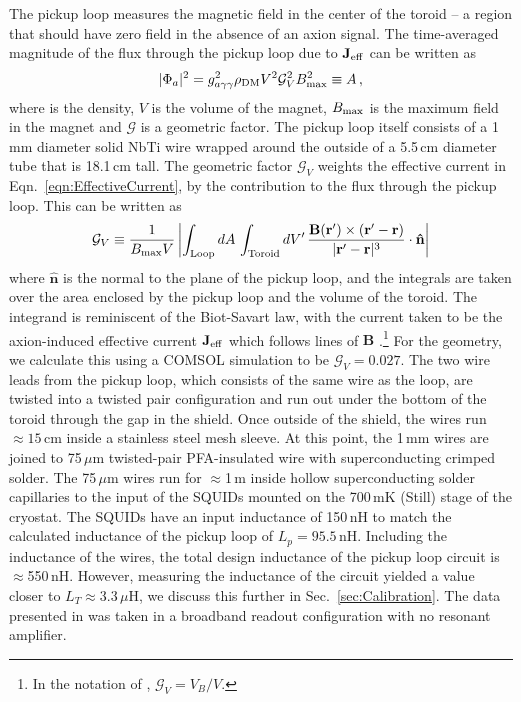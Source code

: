 \documentclass[aps,prd,amsmath,amssymb,reprint,superscriptaddress, nofootinbib,
]{revtex4-1}
\begin{document}
The pickup loop measures the magnetic field in the center of the toroid -- a region that should have zero field in the absence of an axion signal. The time-averaged magnitude of the flux through the pickup loop due to $\mathbf{J}_{\rm eff}$ can be written as
\begin{equation}
|\Phi_a|^2 = g_{a\gamma\gamma}^2\rho_{\rm DM} V^2\mathcal{G}_V^2B_{\rm max}^2\equiv A\,,
\label{eq:pickup_flux_power}
\end{equation}
where \rhoDM is the \DM density, $V$ is the volume of the magnet, $B_{\rm max}$ is the maximum field in the magnet and $\mathcal{G}$ is a geometric factor. The pickup loop itself consists of a 1\,mm diameter solid NbTi wire wrapped around the outside of a 5.5\,cm diameter \PTFE tube that is 18.1\,cm tall. 
The geometric factor $\mathcal{G}_V$ weights the effective current in Eqn.~\ref{eqn:EffectiveCurrent}, by the contribution to the flux through the pickup loop. This can be written as
\begin{equation}
\small
\mathcal{G}_V \equiv \frac{1}{B_{\rm max}V}\left|\int_{\rm Loop} dA \, \int_{\rm Toroid} dV' \ \!\frac{\mathbf{B}(\mathbf{r}')\times(\mathbf{r}'-\mathbf{r})}{|\mathbf{r}'-\mathbf{r}|^3}\cdot\mathbf{\hat{n}}\right|
\label{eq:GVdef}
\end{equation}
where $\mathbf{\hat{n}}$ is the normal to the plane of the pickup loop, and the integrals are taken over the area enclosed by the pickup loop and the volume of the toroid. The integrand is reminiscent of the Biot-Savart law, with the current taken to be the axion-induced effective current $\mathbf{J}_{\rm eff}$ which follows lines of $\mathbf{B}$ \cite{ABRA2016}.\footnote{In the notation of \cite{ABRA2016}, $\mathcal{G}_V = V_B/V$.} For the \abra geometry, we calculate this using a COMSOL \cite{COMSOL} simulation to be $\mathcal{G}_V=0.027$. 
The two wire leads from the pickup loop, which consists of the same wire as the loop, are twisted into a twisted pair configuration and run out under the bottom of the toroid through the gap in the shield. Once outside of the shield, the wires run $\approx15$\,cm inside a stainless steel mesh sleeve. At this point, the 1\,mm wires are joined to 75\,$\mu$m twisted-pair PFA-insulated wire with superconducting crimped solder. The 75\,$\mu$m wires run for $\approx$1\,m inside hollow superconducting solder capillaries \cite{Solder-Paper} to the input of the SQUIDs mounted on the 700\,mK (Still) stage of the cryostat. The SQUIDs have an input inductance of 150\,nH to match the calculated inductance of the pickup loop of $L_p=95.5$\,nH. Including the inductance of the wires, the total design inductance of the pickup loop circuit is $\approx$550\,nH. However, measuring the inductance of the circuit yielded a value closer to $L_T\approx3.3\,\mu$H, we discuss this further in Sec.~\ref{sec:Calibration}. The data presented in \cite{ABRAFirstResults} was taken in a broadband readout configuration with no resonant amplifier.
\end{document}
